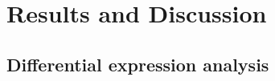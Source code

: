 \documentclass[9pt,twocolumn,twoside]{gsajnl}
\begin{document}





\section*{Results and Discussion}

\subsection{Differential expression analysis}
\end{document}
